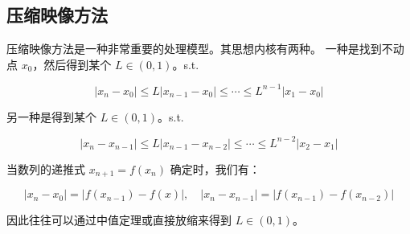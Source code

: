 \documentclass[lang=cn,10pt,thmcnt=section]{elegantbook}
\begin{document}
\subsection{压缩映像方法}
压缩映像方法是一种非常重要的处理模型。其思想内核有两种。
一种是找到不动点 \( x_0 \)，然后得到某个 \( L \in (0,1) \)。s.t.

\[|x_n - x_0| \leq L |x_{n-1} - x_0| \leq \cdots \leq L^{n-1} |x_1 - x_0|\]

另一种是得到某个 \( L \in (0,1) \)。s.t.

\[|x_n - x_{n-1}| \leq L |x_{n-1} - x_{n-2}| \leq \cdots \leq L^{n-2} |x_2 - x_1|\]

当数列的递推式 \( x_{n+1} = f(x_n) \) 确定时，我们有：

\[|x_n - x_0| = |f(x_{n-1}) - f(x)|, \quad |x_n - x_{n-1}| = |f(x_{n-1}) - f(x_{n-2})|\]

因此往往可以通过中值定理或直接放缩来得到 \( L \in (0,1) \)。
\end{document}
